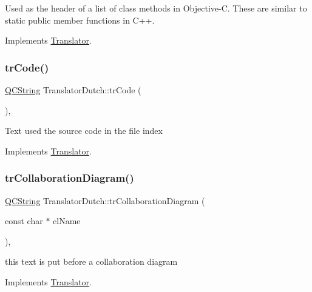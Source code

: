 Used as the header of a list of class methods in Objective-\/C. These are similar to static public member functions in C++. 

Implements \mbox{\hyperlink{class_translator}{Translator}}.

\mbox{\label{class_translator_dutch_a94a325d5f9211ccf02bcfebb328b06fa}} 
\subsubsection{\texorpdfstring{trCode()}{trCode()}}
{\footnotesize\ttfamily \mbox{\hyperlink{class_q_c_string}{Q\+C\+String}} Translator\+Dutch\+::tr\+Code (\begin{DoxyParamCaption}{ }\end{DoxyParamCaption})\hspace{0.3cm}{\ttfamily [inline]}, {\ttfamily [virtual]}}

Text used the source code in the file index 

Implements \mbox{\hyperlink{class_translator}{Translator}}.

\mbox{\label{class_translator_dutch_a2ef465171e65b75761ad316e865f9af6}} 
\subsubsection{\texorpdfstring{trCollaborationDiagram()}{trCollaborationDiagram()}}
{\footnotesize\ttfamily \mbox{\hyperlink{class_q_c_string}{Q\+C\+String}} Translator\+Dutch\+::tr\+Collaboration\+Diagram (\begin{DoxyParamCaption}\item[{const char $\ast$}]{cl\+Name }\end{DoxyParamCaption})\hspace{0.3cm}{\ttfamily [inline]}, {\ttfamily [virtual]}}

this text is put before a collaboration diagram 

Implements \mbox{\hyperlink{class_translator}{Translator}}.

\mbox{\label{class_translator_dutch_a7218285d03e984a2fef5c9a69645a1a4}} 
